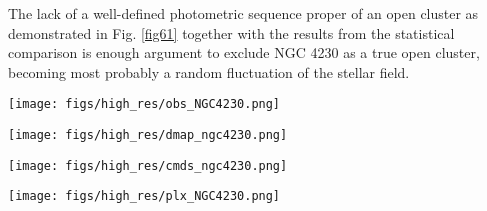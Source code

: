 \documentclass{aa}
\begin{document}
The lack of a well-defined photometric sequence proper of an open cluster as
demonstrated in Fig. \ref{fig61} together with the results from
the statistical comparison is enough argument to exclude NGC 4230 as a true open
cluster, becoming most probably a random fluctuation of the stellar field.

\begin{figure*}[ht]
    \centering
    \texttt{[image: figs/high\_res/obs\_NGC4230.png]}
    \caption{Idem Fig. \ref{fig3} for NGC 4230.}
    \label{fig59}
\end{figure*}
\begin{figure*}[ht]
    \centering
    \texttt{[image: figs/high\_res/dmap\_ngc4230.png]}
    \caption{Idem Fig. \ref{fig4} for NGC 4230.}
    \label{fig60}
\end{figure*}
\begin{figure*}[ht]
    \centering
    \texttt{[image: figs/high\_res/cmds\_ngc4230.png]}
    \caption{Idem Fig. \ref{fig5} for NGC 4230.}
    \label{fig61}
\end{figure*}
\begin{figure*}[ht]
    \centering
    \texttt{[image: figs/high\_res/plx\_NGC4230.png]}
    \caption{Idem Fig. \ref{fig6} for NGC 4230.}
    \label{fig62}
\end{figure*}
\end{document}

